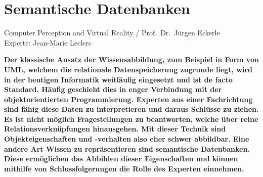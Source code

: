 \documentclass[
    paper=a4,               %
    fontsize=10pt,          %
    open=right,             %
    titlepage=false,        %
    parskip=half,           %
]{scrreprt}                 %
\begin{document}
    \chapter*{Semantische Datenbanken}

    Computer Perception and Virtual Reality / Prof.\ Dr.\ Jürgen Eckerle\\
    Experte: Jean-Marie Leclerc

    \textbf{Der klassische Ansatz der Wissensabbildung, zum Beispiel in Form von UML, welchem die relationale Datenspeicherung zugrunde liegt, wird in der heutigen Informatik weitläufig eingesetzt und ist de facto Standard. Häufig geschieht dies in enger Verbindung mit der objektorientierten Programmierung. Experten aus einer Fachrichtung sind fähig diese Daten zu interpretieren und daraus Schlüsse zu ziehen. Es ist nicht möglich Fragestellungen zu beantworten, welche über reine Relationsverknüpfungen hinausgehen. Mit dieser Technik sind Objekteigenschaften und -verhalten also eher schwer abbildbar. Eine andere Art Wissen zu repräsentieren sind semantische Datenbanken. Diese ermöglichen das Abbilden dieser Eigenschaften und können mithilfe von Schlussfolgerungen die Rolle des Experten einnehmen.}
\end{document}
